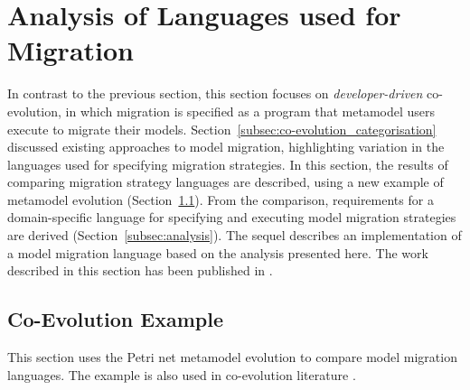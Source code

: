
\section{Analysis of Languages used for Migration}
\label{sec:analyis_of_languages_used_for_migration}
In contrast to the previous section, this section focuses on \emph{developer-driven} co-evolution, in which migration is specified as a program that metamodel users execute to migrate their models. Section~\ref{subsec:co-evolution_categorisation} discussed existing approaches to model migration, highlighting variation in the languages used for specifying migration strategies. In this section, the results of comparing migration strategy languages are described, using a new example of metamodel evolution (Section~\ref{subsec:co-evo_example}). From the comparison, requirements for a domain-specific language for specifying and executing model migration strategies are derived (Section~\ref{subsec:analysis}). The sequel describes an implementation of a model migration language based on the analysis presented here. The work described in this section has been published in \cite{rose10flock}.

\subsection{Co-Evolution Example}
\label{subsec:co-evo_example}
This section uses the Petri net metamodel evolution to compare model migration languages. The example is also used in co-evolution literature \cite{cicchetti08automating,garces09managing,wachsmuth07metamodel}.

